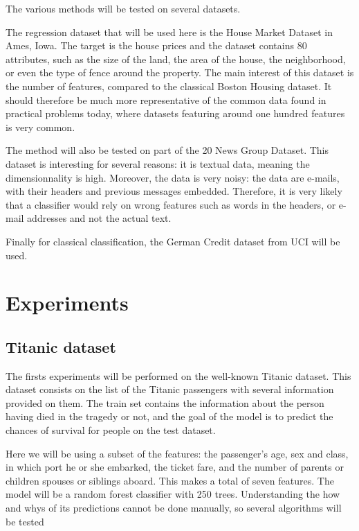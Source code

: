 \documentclass[a4paper,11pt]{kth-mag}
\begin{document}
The various methods will be tested on several datasets.

The regression dataset that will be used here is the House Market Dataset in Ames, Iowa. The target is the house prices and the dataset contains 80 attributes, such as the size of the land, the area of the house, the neighborhood, or even the type of fence around the property. The main interest of this dataset is the number of features, compared to the classical Boston Housing dataset. It should therefore be much more representative of the common data found in practical problems today, where datasets featuring around one hundred features is very common.

The method will also be tested on part of the 20 News Group Dataset. This dataset is interesting for several reasons: it is textual data, meaning the dimensionnality is high. Moreover, the data is very noisy: the data are e-mails, with their headers and previous messages embedded. Therefore, it is very likely that a classifier would rely on wrong features such as words in the headers, or e-mail addresses and not the actual text.

Finally for classical classification, the German Credit dataset from UCI will be used.


\chapter{Experiments}

\section{Titanic dataset}

The firsts experiments will be performed on the well-known Titanic dataset. This dataset consists on the list of the Titanic passengers with several information provided on them. The train set contains the information about the person having died in the tragedy or not, and the goal of the model is to predict the chances of survival for people on the test dataset.

Here we will be using a subset of the features: the passenger's age, sex and class, in which port he or she embarked, the ticket fare, and the number of parents or children spouses or siblings aboard. This makes a total of seven features. The model will be a random forest classifier with 250 trees. Understanding the how and whys of its predictions cannot be done manually, so several algorithms will be tested
\end{document}
